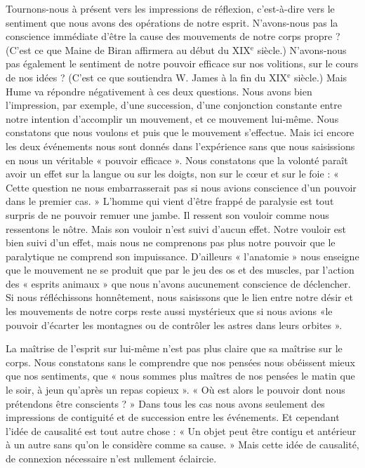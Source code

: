 Tournons-nous à présent vers les impressions de réflexion,
c’est-à-dire vers le sentiment que nous avons des opérations de notre esprit.
N’avons-nous pas la conscience
immédiate d’être la cause des mouvements de notre
corps propre ? (C’est ce que Maine de Biran affirmera
au début du {\footnotesize XIX}$^\text{e}$ siècle.) N’avons-nous pas également le
sentiment de notre pouvoir efficace sur nos volitions, sur
le cours de nos idées ? (C’est ce que soutiendra W. James
à la fin du {\footnotesize XIX}$^\text{e}$ siècle.) Mais Hume va répondre négativement 
à ces deux questions. Nous avons bien l’impression,
par exemple, d’une succession, d’une conjonction constante
entre notre intention d’accomplir un mouvement, et ce
mouvement lui-même. Nous constatons que nous voulons
et puis que le mouvement s’effectue. Mais ici encore les
deux événements nous sont donnés dans l’expérience
sans que nous saisissions en nous un véritable « pouvoir
efficace ». Nous constatons que la volonté paraît avoir un
effet sur la langue ou sur les doigts, non sur le cœur et sur
le foie : « Cette question ne nous embarrasserait pas si
nous avions conscience d’un pouvoir dans le premier
cas. » L’homme qui vient d’être frappé de paralysie est
tout surpris de ne pouvoir remuer une jambe. Il ressent
son vouloir comme nous ressentons le nôtre. Mais son
vouloir n’est suivi d’aucun effet. Notre vouloir est bien
suivi d’un effet, mais nous ne comprenons pas plus notre
pouvoir que le paralytique ne comprend son impuissance.
D'ailleurs « l'anatomie » nous enseigne que le mouvement
ne se produit que par le jeu des os et des muscles, par
l’action des « esprits animaux » que nous n’avons aucunement 
conscience de déclencher. Si nous réfléchissons
honnêtement, nous saisissons que le lien entre notre désir
et les mouvements de notre corps reste aussi mystérieux
que si nous avions «le pouvoir d’écarter les montagnes ou
de contrôler les astres dans leurs orbites ».

La maîtrise de l'esprit sur lui-même n’est pas plus
claire que sa maîtrise sur le corps. Nous constatons sans
le comprendre que nos pensées nous obéissent mieux que
nos sentiments, que « nous sommes plus maîtres de nos
pensées le matin que le soir, à jeun qu’après un repas
copieux ». « Où est alors le pouvoir dont nous prétendons
être conscients ? » Dans tous les cas nous avons seulement
des impressions de contiguité et de succession entre les
événements. Et cependant l’idée de causalité est tout autre
chose : « Un objet peut être contigu et antérieur à un autre
sans qu’on le considère comme sa cause. » Mais cette idée de
causalité, de connexion nécessaire n’est nullement éclaircie.

